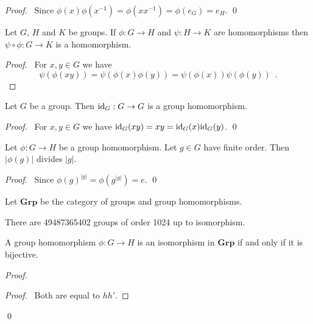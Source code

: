 \begin{proof}
    \pf\ Since $\phi(x) \phi(x^{-1}) = \phi(xx^{-1}) = \phi(e_G) = e_H$. \qed
\end{proof}

\begin{prop}
    Let $G$, $H$ and $K$ be groups. If $\phi : G \rightarrow H$ and $\psi : H \rightarrow K$ are homomorphisms then $\psi \circ \phi : G \rightarrow K$ is a homomorphism.
\end{prop}

\begin{proof}
    \pf\ For $x,y \in G$ we have
    \[ \psi(\phi(xy)) = \psi(\phi(x) \phi(y)) = \psi(\phi(x)) \psi(\phi(y)) \enspace . \]
\end{proof}

\begin{prop}
    Let $G$ be a group. Then $\mathrm{id}_{G} : G \rightarrow G$ is a group homomorphism.
\end{prop}

\begin{proof}
    \pf\ For $x,y \in G$ we have $\mathrm{id}_{G}(xy) = xy = \mathrm{id}_{G}(x) \mathrm{id}_{G}(y)$. \qed
\end{proof}

\begin{prop}
    Let $\phi : G \rightarrow H$ be a group homomorphism. Let $g \in G$ have finite order. Then $|\phi(g)|$ divides $|g|$.
\end{prop}

\begin{proof}
    \pf\ Since $\phi(g)^{|g|} = \phi(g^{|g|}) = e$. \qed
\end{proof}

\begin{df}
    Let $\mathbf{Grp}$ be the category of groups and group homomorphisms.
\end{df}

\begin{ex}
There are 49487365402 groups of order 1024 up to isomorphism. %
\end{ex}

\begin{prop}
    A group homomorphism $\phi : G \rightarrow H$ is an isomorphism in $\mathbf{Grp}$ if and only if it is bijective.
\end{prop}

\begin{proof}
    \pf
    \begin{proof}
        \pf\ Both are equal to $hh'$.
    \end{proof}
    \qed
\end{proof}

